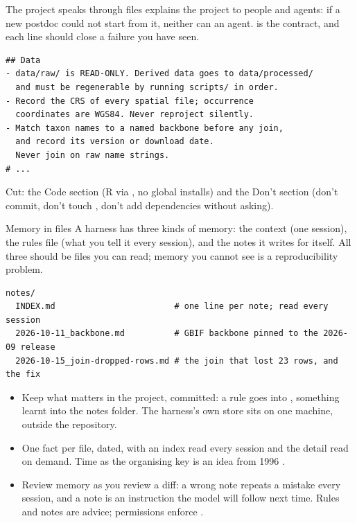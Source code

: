 \documentclass[11pt,aspectratio=169]{beamer}
\begin{document}
\begin{frame}[fragile]{The project speaks through files}
   explains the project to people and agents: if a new
  postdoc could not start from it, neither can an agent. 
  is the contract, and each line should close a failure you have seen.
\begin{lstlisting}
## Data
- data/raw/ is READ-ONLY. Derived data goes to data/processed/
  and must be regenerable by running scripts/ in order.
- Record the CRS of every spatial file; occurrence
  coordinates are WGS84. Never reproject silently.
- Match taxon names to a named backbone before any join,
  and record its version or download date.
  Never join on raw name strings.
# ...
\end{lstlisting}
  Cut: the Code section (R via , no global installs) and the
  Don't section (don't commit, don't touch , don't add
  dependencies without asking).
\end{frame}

\begin{frame}[fragile]{Memory in files}
  A harness has three kinds of memory: the context (one session), the rules
  file (what you tell it every session), and the notes it writes for itself.
  All three should be files you can read; memory you cannot see is a
  reproducibility problem.
\begin{lstlisting}[style=shell]
notes/
  INDEX.md                        # one line per note; read every session
  2026-10-11_backbone.md          # GBIF backbone pinned to the 2026-09 release
  2026-10-15_join-dropped-rows.md # the join that lost 23 rows, and the fix
\end{lstlisting}
  \begin{itemize}\small
    \item Keep what matters in the project, committed: a rule goes into
      , something learnt into the notes folder. The harness's
      own store sits on one machine, outside the repository.
    \item One fact per file, dated, with an index read every session and the
      detail read on demand. Time as the organising key is an idea from 1996
      \parencite{freeman1996lifestreams}.
    \item Review memory as you review a diff: a wrong note repeats a mistake
      every session, and a note is an instruction the model will follow next
      time. Rules and notes are advice; permissions enforce
      \parencite{liu2026claudecode}.
  \end{itemize}
\end{frame}
\end{document}
